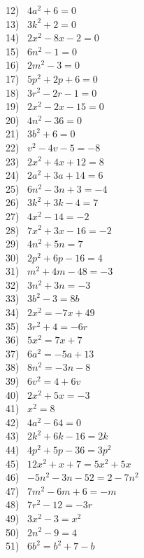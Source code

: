 \documentclass[12pt]{book}
\theoremstyle{definition}
\begin{document}
\begin{multicols}{3}
  12)~ $4 a^2 + 6 = 0$\\
  13)~ $3 k^2 + 2 = 0$\\
  14)~ $2 x^2 - 8 x - 2 = 0$\\
  15)~ $6 n^2 - 1 = 0$\\
  16)~ $2 m^2 - 3 = 0$\\
  17)~ $5 p^2 + 2 p + 6 = 0$\\
  18)~ $3 r^2 - 2 r - 1 = 0$\\
  19)~ $2 x^2 - 2 x - 15 = 0$\\
  20)~ $4 n^2 - 36 = 0$\\
  21)~ $3 b^2 + 6 = 0$\\
  22)~ $v^2 - 4 v - 5 = - 8$\\
  23)~ $2 x^2 + 4 x + 12 = 8$\\
  24)~ $2 a^2 + 3 a + 14 = 6$\\
  25)~ $6 n^2 - 3 n + 3 = - 4$\\
  26)~ $3 k^2 + 3 k - 4 = 7$\\
  27)~ $4 x^2 - 14 = - 2$\\
  28)~ $7 x^2 + 3 x - 16 = - 2$\\
  29)~ $4 n^2 + 5 n = 7$\\
  30)~ $2 p^2 + 6 p - 16 = 4$\\
  31)~ $m^2 + 4 m - 48 = - 3$\\
  32)~ $3 n^2 + 3 n = - 3$\\
  33)~ $3 b^2 - 3 = 8 b$\\
  34)~ $2 x^2 = - 7 x + 49$\\
  35)~ $3 r^2 + 4 = - 6 r$\\
  36)~ $5 x^2 = 7 x + 7$\\
  37)~ $6 a^2 = - 5 a + 13$\\
  38)~ $8 n^2 = - 3 n - 8$\\
  39)~ $6 v^2 = 4 + 6 v$\\
  40)~ $2 x^2 + 5 x = - 3$\\
  41)~ $x^2 = 8$\\
  42)~ $4 a^2 - 64 = 0$\\
  43)~ $2 k^2 + 6 k - 16 = 2 k$\\
  44)~ $4 p^2 + 5 p - 36 = 3 p^2$\\
  45)~ $12 x^2 + x + 7 = 5 x^2 + 5 x$\\
  46)~ $- 5 n^2 - 3 n - 52 = 2 - 7 n^2$\\
  47)~ $7 m^2 - 6 m + 6 = - m$\\
  48)~ $7 r^2 - 12 = - 3 r$\\
  49)~ $3 x^2 - 3 = x^2$\\
  50)~ $2 n^2 - 9 = 4$\\
  51)~ $6 b^2 = b^2 + 7 - b$
\end{multicols}
\end{document}
